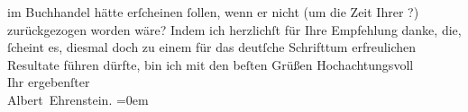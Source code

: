                     im Buchhandel hätte erſcheinen ſollen, wenn er nicht (um die Zeit Ihrer \label{K_L01912_4v}\label{K_L01912_4h}?) zurückgezogen worden wäre?\pend
           \pstart
           Indem ich herzlichſt für Ihre Empfehlung danke, die, ſcheint es, diesmal doch zu
                    einem für das deutſche Schrifttum erfreulichen Resultate führen dürfte, bin ich mit den beſten
                    Grüßen\pend
           \pstart
           Hochachtungsvoll{\\[\baselineskip]}Ihr ergebenſter{\\[\baselineskip]}\spacefill\mbox{Albert Ehrenstein.}\pend
           \leftskip=0em{}\endnumbering{}  
      